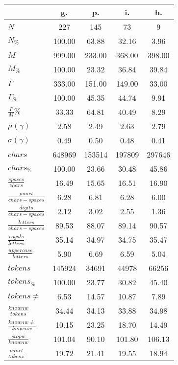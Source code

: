 \begin{table}[h!]
\begin{center}
\begin{tabular}{| l || c | c | c | c |}\hline
 & {\bf g.} & {\bf p.} & {\bf i.} & {\bf h.} \\\hline\hline
$N$ & 227  & 145  & 73  & 9 \\
$N_{\%}$ & 100.00  & 63.88  & 32.16  & 3.96 \\\hline
$M$ & 999.00  & 233.00  & 368.00  & 398.00 \\
$M_{\%}$ & 100.00  & 23.32  & 36.84  & 39.84 \\\hline
$\Gamma$ & 333.00  & 151.00  & 149.00  & 33.00 \\
$\Gamma_{\%}$ & 100.00  & 45.35  & 44.74  & 9.91 \\\hline
$\frac{\Gamma}{M}\%$ & 33.33  & 64.81  & 40.49  & 8.29 \\
$\mu(\gamma)$ & 2.58  & 2.49  & 2.63  & 2.79 \\
$\sigma(\gamma)$ & 0.49  & 0.50  & 0.48  & 0.41 \\\hline\hline
$chars$ & 648969  & 153514  & 197809  & 297646 \\
$chars_{\%}$ & 100.00  & 23.66  & 30.48  & 45.86 \\\hline
$\frac{spaces}{chars}$ & 16.49  & 15.65  & 16.51  & 16.90 \\
$\frac{punct}{chars-spaces}$ & 6.28  & 6.81  & 6.28  & 6.00 \\
$\frac{digits}{chars-spaces}$ & 2.12  & 3.02  & 2.55  & 1.36 \\\hline
$\frac{letters}{chars-spaces}$ & 89.53  & 88.07  & 89.14  & 90.57 \\
$\frac{vogals}{letters}$ & 35.14  & 34.97  & 34.75  & 35.47 \\
$\frac{uppercase}{letters}$ & 5.90  & 6.69  & 6.59  & 5.04 \\\hline\hline
$tokens$ & 145924  & 34691  & 44978  & 66256 \\
$tokens_{\%}$ & 100.00  & 23.77  & 30.82  & 45.40 \\
$tokens \neq$ & 6.53  & 14.57  & 10.87  & 7.89 \\\hline
$\frac{knownw}{tokens}$ & 34.44  & 34.13  & 33.88  & 34.98 \\
$\frac{knownw \neq}{knownw}$ & 10.15  & 23.25  & 18.70  & 14.49 \\\hline
$\frac{stopw}{knownw}$ & 101.04  & 90.10  & 101.80  & 106.13 \\
$\frac{punct}{tokens}$ & 19.72  & 21.41  & 19.55  & 18.94 \\

\end{tabular}
\end{center}
\end{table}
